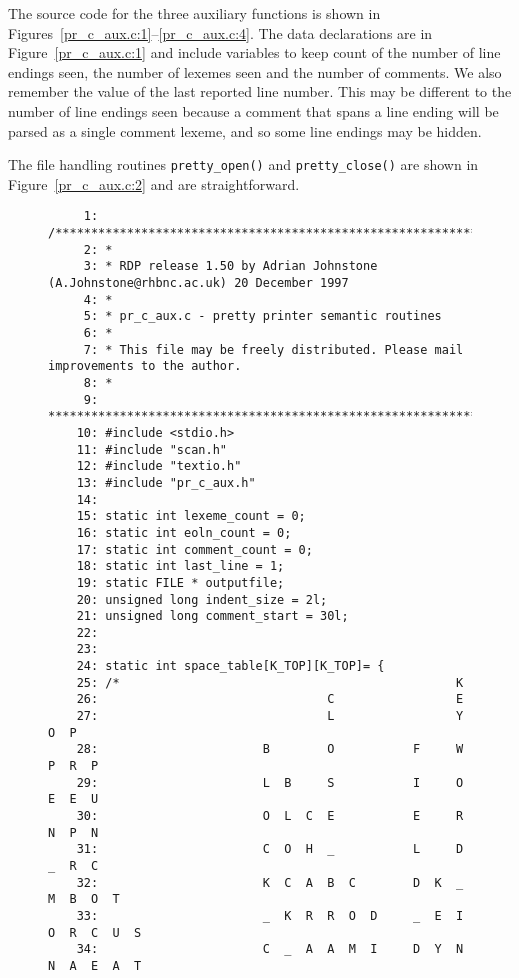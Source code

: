 The source code for the three auxiliary functions is shown in
Figures~\ref{pr_c_aux.c:1}--\ref{pr_c_aux.c:4}. The data declarations
are in Figure~\ref{pr_c_aux.c:1} and include variables to keep count of
the number of line endings seen, the number of lexemes seen and the
number of comments. We also remember the value of the last reported line
number. This may be different to the number of line endings seen because
a comment that spans a line ending will be parsed as a single comment
lexeme, and so some line endings may be hidden.

The file handling routines \verb+pretty_open()+ and
\verb+pretty_close()+ are shown in Figure~\ref{pr_c_aux.c:2} and are
straightforward.

\begin{figure}
\hspace*{-1cm}
\begin{minipage}{30cm}
\footnotesize
\begin{verbatim}
     1: /*******************************************************************************
     2: *
     3: * RDP release 1.50 by Adrian Johnstone (A.Johnstone@rhbnc.ac.uk) 20 December 1997
     4: *
     5: * pr_c_aux.c - pretty printer semantic routines
     6: *
     7: * This file may be freely distributed. Please mail improvements to the author.
     8: *
     9: *******************************************************************************/
    10: #include <stdio.h>
    11: #include "scan.h"
    12: #include "textio.h"
    13: #include "pr_c_aux.h"
    14: 
    15: static int lexeme_count = 0; 
    16: static int eoln_count = 0; 
    17: static int comment_count = 0; 
    18: static int last_line = 1; 
    19: static FILE * outputfile; 
    20: unsigned long indent_size = 2l; 
    21: unsigned long comment_start = 30l; 
    22: 
    23: 
    24: static int space_table[K_TOP][K_TOP]= {
    25: /*                                               K
    26:                                C                 E
    27:                                L                 Y        O  P
    28:                       B        O           F     W        P  R  P
    29:                       L  B     S           I     O        E  E  U
    30:                       O  L  C  E           E     R        N  P  N
    31:                       C  O  H  _           L     D        _  R  C
    32:                       K  C  A  B  C        D  K  _     M  B  O  T
    33:                       _  K  R  R  O  D     _  E  I     O  R  C  U  S
    34:                       C  _  A  A  M  I     D  Y  N     N  A  E  A  T

\end{verbatim}
\end{minipage}
\end{figure}
